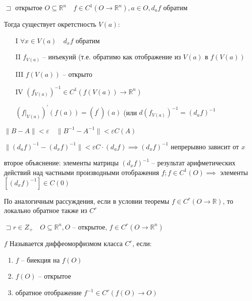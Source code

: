 \documentclass{book}
\newcommand\R{\ensuremath{\mathbb{R}}}
\newcommand{\p}[1]{#1^{\prime}}
\theoremstyle{definition}
\begin{document}
        \begin{theorem}

           $\sqsupset $ открытое $O\subseteq \R^n\quad f\in C^1(O\to \R^n), a\in O, d_af$ обратим

           Тогда существует окретстность $V(a):$
            \begin{enumerate}
                \item [I] $\forall x\in V(a)\quad d_xf$ обратим
                \item [II] $f_{V(a)}$ -- инъекуий (т.е. обратимо как отображение из  $V(a)$ в  $f(V(a))$
                \item [III]  $f(V(a))$ -- открыто
                \item [IV]  $\left( f_{V(a)} \right)^{-1}\in C^1\left( f(V(a))\to \R^n \right)  $ 

                    $ \left( f|_{V(a)} \right)^{\prime}(f(a)) = (\p f)(a) $ (или $d\left( f_{V(a)} \right) ^{-1} = \left( d_af \right) ^{-1}$ 
           \end{enumerate}
        \end{theorem}

        $\|B-A\|<\varepsilon\quad \|B^{-1} - A^{-1}\|<\varepsilon C(A)$

        $\|(d_af)^{-1} - (d_xf)^{-1}\| <\varepsilon C\cdot \left( d_af \right) \implies \left( d_xf \right) ^{-1}$ непрерывно зависит от $x$

        второе объяснение: элементы матрицы $\left( d_xf \right) ^{-1}$ -- результат арифметических действий над частными производными отображения $f; f\in C^1(O) \implies $ элементы $[\left( d_xf \right) ^{-1}]\in C(0)$

        По аналогичным рассуждения, если в условии теоремы $f\in C^r\left( O \to \R \right) $, то локально обратное также из $C^r$



        \begin{definition}
            $\sqsupset r\in Z_+\quad O\subseteq \R^n, O$ -- открытое, $f\in C^r\left( O\to \R^n \right) $

            $f$ Называется диффеоморфизмом класса  $C^r$, если:
             \begin{enumerate}
                 \item $f$ -- биекция на  $f(O)$
                 \item $f(O)$ -- открытое
                 \item  обратное отображение  $f^{-1}\in C^r\left( f(O) \to O \right) $
            \end{enumerate}
        \end{definition}
\end{document}
